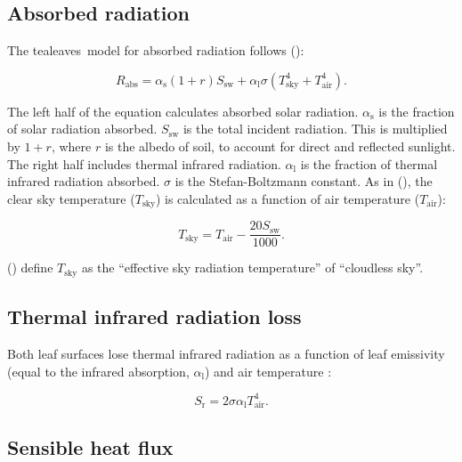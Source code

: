 \documentclass[11pt, oneside]{article}
\newcommand{\pkg}[1]{{\fontseries{b}\selectfont #1}}
\newcommand{\tealeaves}{\pkg{tealeaves}}
\begin{document}
\subsection*{Absorbed radiation}

The \tealeaves~model for absorbed radiation follows \citeauthor{Okajima_etal_2012} (\citeyear{Okajima_etal_2012}):

\begin{equation}
  R_\mathrm{abs} = \alpha_\mathrm{s} (1 + r) S_\mathrm{sw} + \alpha_\mathrm{l} \sigma (T_\mathrm{sky} ^ 4 + T_\mathrm{air} ^ 4).
\end{equation}

The left half of the equation calculates absorbed solar radiation. $\alpha_\mathrm{s}$ is the fraction of solar radiation absorbed. $S_\mathrm{sw}$ is the total incident radiation. This is multiplied by $1 + r$, where $r$ is the albedo of soil, to account for direct and reflected sunlight. The right half includes thermal infrared radiation. $\alpha_\mathrm{l}$ is the fraction of thermal infrared radiation absorbed. $\sigma$ is the Stefan-Boltzmann constant. As in \citeauthor{Okajima_etal_2012} (\citeyear{Okajima_etal_2012}), the clear sky temperature ($T_\mathrm{sky}$) is calculated as a function of air temperature ($T_\mathrm{air}$):

\begin{equation} \label{eq:Tsky}
  T_\mathrm{sky} = T_\mathrm{air} - \frac{20 S_\mathrm{sw}}{1000}.
\end{equation}

\citeauthor{Okajima_etal_2012} (\citeyear{Okajima_etal_2012}) define $T_\mathrm{sky}$ as the ``effective sky radiation temperature'' of ``cloudless sky''.

\subsection*{Thermal infrared radiation loss}

Both leaf surfaces lose thermal infrared radiation as a function of leaf emissivity (equal to the infrared absorption, $\alpha_\mathrm{l}$) and air temperature \citep{Foster_Smith_1986, Okajima_etal_2012}:

\begin{equation}
  S_\mathrm{r} = 2 \sigma \alpha_\mathrm{l} T_\mathrm{air} ^ 4.
\end{equation}
  
\subsection*{Sensible heat flux}
 
\end{document}
